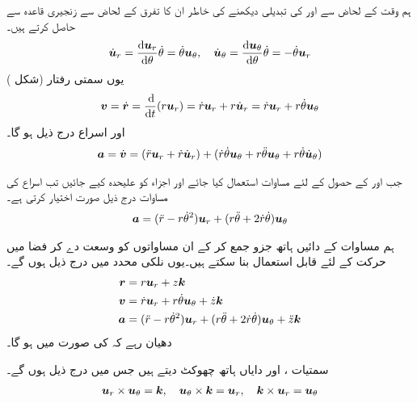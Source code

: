 ہم  وقت کے لحاض سے  اور  کی تبدیلی دیکھنے کی خاطر ان  کا  تفرق  کے لحاض سے زنجیری قاعدہ  سے حاصل کرتے   ہیں۔
\begin{gather}
\begin{aligned}\label{مساوات_سمتی_تفاعل_قطبی_روپ_پ}
\dot{\kvec{u}}_r=\frac{\dif\kvec{u}_r}{\dif\theta}\dot{\theta}=\dot{\theta}\kvec{u}_{\theta},\quad\dot{\kvec{u}}_{\theta}=\frac{\dif\kvec{u}_{\theta}}{\dif\theta}\dot{\theta}=-\dot{\theta}\kvec{u}_r
\end{aligned}
\end{gather}
یوں سمتی رفتار (شکل )
\begin{align}\label{مساوات_سمتی_تفاعل_قطبی_روپ_ت}
\kvec{v}=\dot{\kvec{r}}=\frac{\dif}{\dif t}(r\kvec{u}_r)=\dot{r}\kvec{u}_r+r\dot{\kvec{u}}_r=\dot{r}\kvec{u}_r+r\dot{\theta}\kvec{u}_{\theta}
\end{align}
اور اسراع  درج  ذیل ہو گا۔
\begin{align}\label{مساوات_سمتی_تفاعل_قطبی_روپ_ٹ}
{\ensuremath{{\boldsymbol{a}}}}=\dot{{{\boldsymbol{v}}}}=(\ddot{r}{{\boldsymbol{u}}}_r+\dot{r}\dot{{{\boldsymbol{u}}}}_r)+(\dot{r}\dot{\theta}{{\boldsymbol{u}}}_{\theta}+r\ddot{\theta}{{\boldsymbol{u}}}_{\theta}+r\dot{\theta}\dot{{{\boldsymbol{u}}}}_{\theta})
\end{align}

جب  اور  کے حصول کے لئے   مساوات  استعمال کیا جائے اور اجزاء کو علیحدہ کیے جائیں  تب اسراع کی مساوات   درج ذیل  صورت اختیار کرتی ہے۔
\begin{align}
{\ensuremath{{\boldsymbol{a}}}}=(\ddot{r}-r\dot{\theta}^2){{\boldsymbol{u}}}_r+(r\ddot{\theta}+2\dot{r}\dot{\theta}){{\boldsymbol{u}}}_{\theta}
\end{align} 

 ہم مساوات  کے دائیں ہاتھ جزو    جمع کر کے ان مساواتوں کو وسعت دے کر  فضا میں حرکت کے لئے  قابل استعمال بنا سکتے ہیں۔یوں نلکی محدد میں درج ذیل ہوں گے۔
\begin{gather}
\begin{aligned}
{\ensuremath{{\boldsymbol{r}}}}&=r{{\boldsymbol{u}}}_r+z{\boldsymbol{k}}\\
{{\boldsymbol{v}}}&=\dot{r}{{\boldsymbol{u}}}_r+r\dot{\theta}{{\boldsymbol{u}}}_{\theta}+\dot{z}{\boldsymbol{k}}\\
{{\boldsymbol{a}}}&=(\ddot{r}-r\dot{\theta}^2){{\boldsymbol{u}}}_r+(r\ddot{\theta}+2\dot{r}\dot{\theta}){{\boldsymbol{u}}}_{\theta}+\ddot{z}{\boldsymbol{k}}
\end{aligned}
\end{gather}
دھیان رہے کہ  کی صورت میں  ہو گا۔

سمتیات ،  اور  دایاں ہاتھ چھوکٹ دیتے ہیں جس میں درج ذیل ہوں گے۔
\begin{align}
{\ensuremath{{\boldsymbol{u}}}}_r\times{\ensuremath{{\boldsymbol{u}}}}_{\theta}={\boldsymbol{k}},\quad {\ensuremath{{\boldsymbol{u}}}}_{\theta}\times{\boldsymbol{k}}={{\boldsymbol{u}}}_r,\quad {\boldsymbol{k}}\times{\ensuremath{{\boldsymbol{u}}}}_r={{\boldsymbol{u}}}_{\theta}
\end{align}
